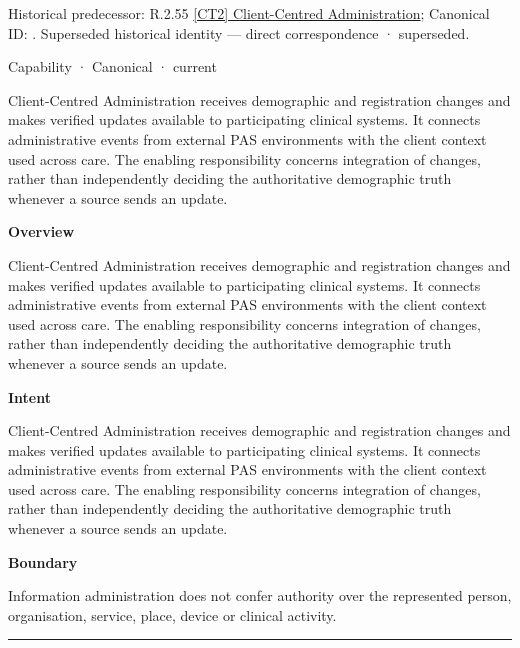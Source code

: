 {\small Historical predecessor: R.2.55 \hyperref[element:232b3fb2ff204c9b9ff7a60ff6a7a32d]{[CT2] Client-Centred Administration}; Canonical ID: \texttt{}. Superseded historical identity — direct correspondence · superseded.}\par
\label{element:8752b7a937754b2faa296300c6a48911}
{\small Capability · Canonical · current}\par

Client-Centred Administration receives demographic and registration changes and makes verified updates available to participating clinical systems. It connects administrative events from external PAS environments with the client context used across care. The enabling responsibility concerns integration of changes, rather than independently deciding the authoritative demographic truth whenever a source sends an update.



\textbf{Overview}



Client-Centred Administration receives demographic and registration changes and makes verified updates available to participating clinical systems. It connects administrative events from external PAS environments with the client context used across care. The enabling responsibility concerns integration of changes, rather than independently deciding the authoritative demographic truth whenever a source sends an update.



\textbf{Intent}



Client-Centred Administration receives demographic and registration changes and makes verified updates available to participating clinical systems. It connects administrative events from external PAS environments with the client context used across care. The enabling responsibility concerns integration of changes, rather than independently deciding the authoritative demographic truth whenever a source sends an update.



\textbf{Boundary}



Information administration does not confer authority over the represented person, organisation, service, place, device or clinical activity.



\medskip\hrule\medskip

